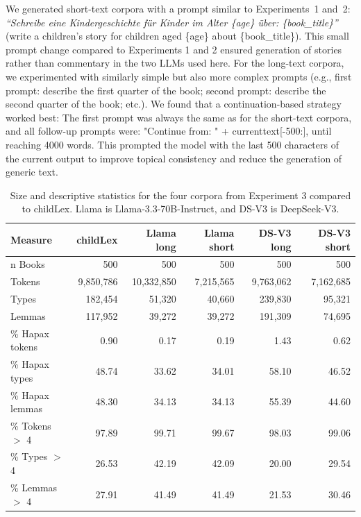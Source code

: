 \documentclass[manuscript]{stjour}
\begin{document}
We generated short-text corpora with a prompt similar to Experiments~1 and~2: \textit{``Schreibe eine Kindergeschichte für Kinder im Alter \{age\} über: \{book\_title\}''} (write a children’s story for children aged \{age\} about \{book\_title\}). This small prompt change compared to Experiments 1 and 2 ensured generation of stories rather than commentary in the two LLMs used here. For the long-text corpora, we experimented with similarly simple but also more complex prompts (e.g., first prompt: describe the first quarter of the book; second prompt: describe the second quarter of the book; etc.). We found that a continuation-based strategy worked best: The first prompt was always the same as for the short-text corpora, and all follow-up prompts were: "Continue from: " + currenttext[-500:], until reaching 4000 words. This prompted the model with the last 500 characters of the current output to improve topical consistency and reduce the generation of generic text. 


\begin{table}[!ht]
\caption{Size and descriptive statistics for the four corpora from Experiment 3 compared to childLex. Llama is Llama-3.3-70B-Instruct, and DS-V3 is DeepSeek-V3.}
\centering
\begin{tabular}{lrrrrr}
  \hline
Measure & childLex & Llama long & Llama short & DS-V3 long & DS-V3 short \\ 
  \hline
n Books & 500 & 500 & 500 & 500 & 500 \\ 
  Tokens & 9,850,786 & 10,332,850 & 7,215,565 & 9,763,062 & 7,162,685 \\ 
  Types & 182,454 & 51,320 & 40,660 & 239,830 & 95,321 \\ 
  Lemmas & 117,952 & 39,272 & 39,272 & 191,309 & 74,695 \\ 
  \% Hapax tokens & 0.90 & 0.17 & 0.19 & 1.43 & 0.62 \\ 
  \% Hapax types & 48.74 & 33.62 & 34.01 & 58.10 & 46.52 \\ 
  \% Hapax lemmas & 48.30 & 34.13 & 34.13 & 55.39 & 44.60 \\ 
  \% Tokens $>$ 4 & 97.89 & 99.71 & 99.67 & 98.03 & 99.06 \\ 
  \% Types $>$ 4 & 26.53 & 42.19 & 42.09 & 20.00 & 29.54 \\ 
  \% Lemmas $>$ 4 & 27.91 & 41.49 & 41.49 & 21.53 & 30.46 \\ 
   \hline
\end{tabular}
\label{freqComp3}
\end{table}
\end{document}
